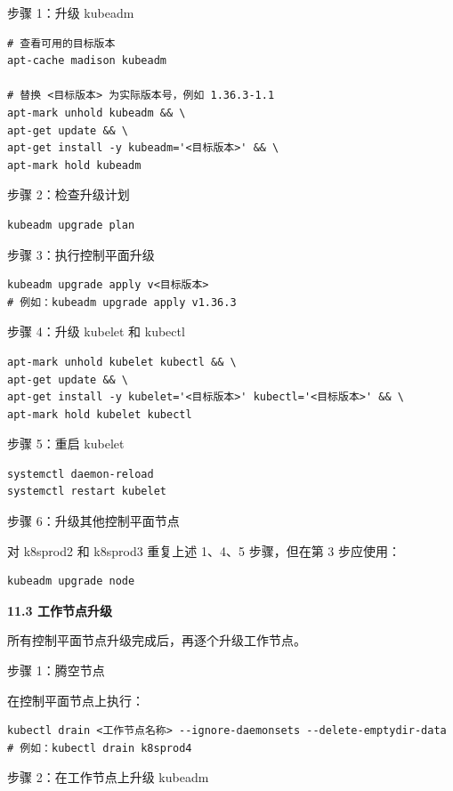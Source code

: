 \documentclass[12pt,UTF8]{ctexbook}
\begin{document}
步骤 1：升级 kubeadm

\begin{lstlisting}
# 查看可用的目标版本
apt-cache madison kubeadm

# 替换 <目标版本> 为实际版本号，例如 1.36.3-1.1
apt-mark unhold kubeadm && \
apt-get update && \
apt-get install -y kubeadm='<目标版本>' && \
apt-mark hold kubeadm
\end{lstlisting}

步骤 2：检查升级计划

\begin{lstlisting}
kubeadm upgrade plan
\end{lstlisting}

步骤 3：执行控制平面升级

\begin{lstlisting}
kubeadm upgrade apply v<目标版本>
# 例如：kubeadm upgrade apply v1.36.3
\end{lstlisting}

步骤 4：升级 kubelet 和 kubectl

\begin{lstlisting}
apt-mark unhold kubelet kubectl && \
apt-get update && \
apt-get install -y kubelet='<目标版本>' kubectl='<目标版本>' && \
apt-mark hold kubelet kubectl
\end{lstlisting}

步骤 5：重启 kubelet

\begin{lstlisting}
systemctl daemon-reload
systemctl restart kubelet
\end{lstlisting}

步骤 6：升级其他控制平面节点

对 k8sprod2 和 k8sprod3 重复上述 1、4、5 步骤，但在第 3 步应使用：

\begin{lstlisting}
kubeadm upgrade node
\end{lstlisting}

\textbf{11.3 工作节点升级}

所有控制平面节点升级完成后，再逐个升级工作节点。

步骤 1：腾空节点

在控制平面节点上执行：

\begin{lstlisting}
kubectl drain <工作节点名称> --ignore-daemonsets --delete-emptydir-data
# 例如：kubectl drain k8sprod4
\end{lstlisting}

步骤 2：在工作节点上升级 kubeadm
\end{document}
